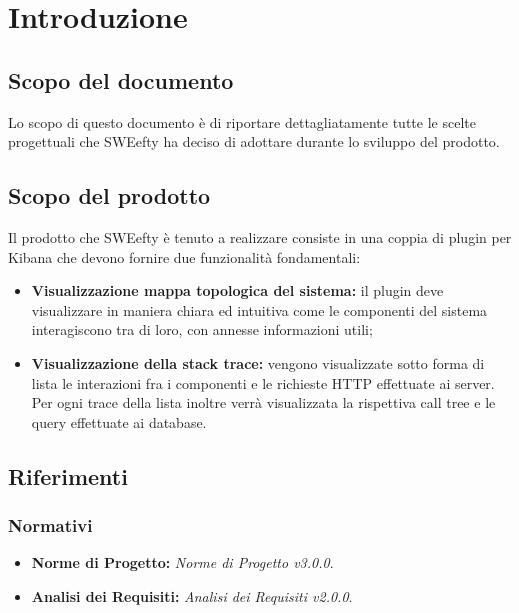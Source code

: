 \section{Introduzione}
\label{sec:intro}
\subsection{Scopo del documento}
Lo scopo di questo documento è di riportare dettagliatamente tutte le scelte progettuali che SWEefty ha deciso di adottare durante lo sviluppo del prodotto.

\subsection{Scopo del prodotto}
Il prodotto che SWEefty è tenuto a realizzare consiste in una coppia di plugin per Kibana che devono fornire due funzionalità fondamentali:
\begin{itemize}
	\item \textbf{Visualizzazione mappa topologica del sistema:} il plugin deve visualizzare in maniera chiara ed intuitiva come le componenti del sistema interagiscono tra di loro, con annesse informazioni utili;
	\item \textbf{Visualizzazione della stack trace:} vengono visualizzate sotto forma di lista le interazioni fra i componenti e le richieste HTTP effettuate ai server. Per ogni trace della lista inoltre verrà visualizzata la rispettiva call tree e le query effettuate ai database.
\end{itemize}

\subsection{Riferimenti}
\subsubsection{Normativi}
\begin{itemize}
	\item \textbf{Norme di Progetto:} \emph{Norme di Progetto v3.0.0}.
	\item \textbf{Analisi dei Requisiti:} \emph{Analisi dei Requisiti v2.0.0}.
\end{itemize}

